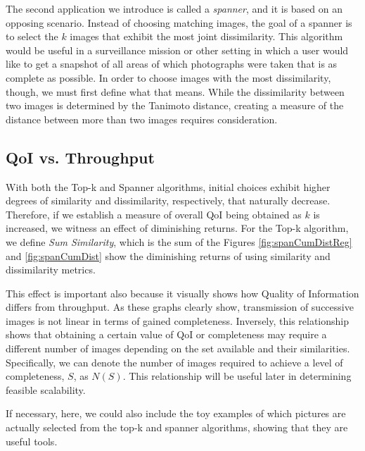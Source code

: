 The second application we introduce is called a \emph{spanner}, and it is based on an opposing scenario.  Instead of  choosing matching images, the goal of a spanner is to select the $k$ images that exhibit the most joint dissimilarity.  This algorithm would be useful in a surveillance mission or other setting in which a user would like to get a snapshot of all areas of which photographs were taken that is as complete as possible.  In order to choose images with the most dissimilarity, though, we must first define what that means.  While the dissimilarity between two images is determined by the Tanimoto distance, creating a measure of the distance between more than two images requires consideration.  

\subsection{QoI vs. Throughput}

With both the Top-k and Spanner algorithms, initial choices exhibit higher degrees of similarity and dissimilarity, respectively, that naturally decrease.  Therefore, if we establish a measure of overall QoI being obtained as $k$ is increased, we witness an effect of diminishing returns.  For the Top-k algorithm, we define \emph{Sum Similarity}, which is the sum of the Figures \ref{fig:spanCumDistReg} and \ref{fig:spanCumDist} show the diminishing returns of using similarity and dissimilarity metrics.

This effect is important also because it visually shows how Quality of Information differs from throughput.  As these graphs clearly show, transmission of successive images is not linear in terms of gained completeness.  Inversely, this relationship shows that obtaining a certain value of QoI or completeness may require a different number of images depending on the set available and their similarities.  Specifically, we can denote the number of images required to achieve a level of completeness, $S$, as $N(S)$.  This relationship will be useful later in determining feasible scalability.


If necessary, here, we could also include the toy examples of which pictures are actually selected from the top-k and spanner algorithms, showing that they are useful tools.




